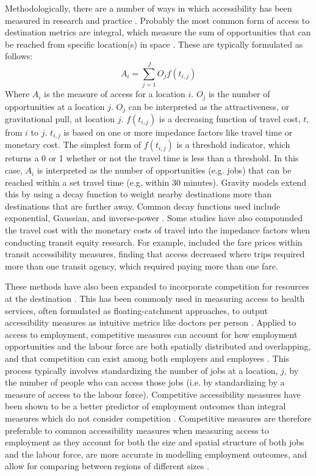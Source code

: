 \documentclass[11 pt, letterpaper]{article}
\begin{document}
{Methodologically, there are a number of ways in which accessibility has been measured in research and practice \cite{handy1997,geurs2004,kwan1998}. Probably the most common form of access to destination metrics are integral, which measure the sum of opportunities that can be reached from specific location(s) in space \cite{handy1997,kwan1998}. These are typically formulated as follows: 
\begin{equation}
A_{i} = \sum_{j = 1}^{J} O_j f(t_{i,j}) 
\end{equation}
Where $A_i$ is the measure of access for a location $i$. $O_j$ is the number of opportunities at a location $j$. $O_j$ can be interpreted as the attractiveness, or gravitational pull, at location $j$. $f(t_{i,j})$ is a decreasing function of travel cost, $t$, from $i$ to $j$. $t_{i,j}$ is based on one or more impedance factors like travel time or monetary cost. The simplest form of $f(t_{i,j})$ is a threshold indicator, which returns a 0 or 1 whether or not the travel time is less than a threshold. In this case, $A_i$ is interpreted as the number of opportunities (e.g. jobs) that can be reached within a set travel time (e.g. within 30 minutes). Gravity models extend this by using a decay function to weight nearby destinations more than destinations that are further away. Common decay functions used include exponential, Gaussian, and inverse-power \cite{handy1997,kwan1998}. Some studies have also compounded the travel cost with the monetary costs of travel into the impedance factors when conducting transit equity research. For example,  included the fare prices within transit accessibility measures, finding that access decreased where trips required more than one transit agency, which required paying more than one fare.

These methods have also been expanded to incorporate competition for resources at the destination \cite{weibull1976}. This has been commonly used in measuring access to health services, often formulated as floating-catchment approaches, to output accessibility measures as intuitive metrics like doctors per person \cite{luo2003,delamater2013}. Applied to access to employment, competitive measures can account for how employment opportunities and the labour force are both spatially distributed and overlapping, and that competition can exist among both employers and employees . This process typically involves standardizing the number of jobs at a location, $j$, by the number of people who can access those jobs (i.e. by standardizing by a measure of access to the labour force). Competitive accessibility measures have been shown to be a better predictor of employment outcomes than integral measures which do not consider competition \cite{merlin2017}. Competitive measures are therefore preferable to common accessibility measures when measuring access to employment as they account for both the size and spatial structure of both jobs and the labour force, are more accurate in modelling employment outcomes, and allow for comparing between regions of different sizes \cite{geurs2003}.

}
\end{document}
